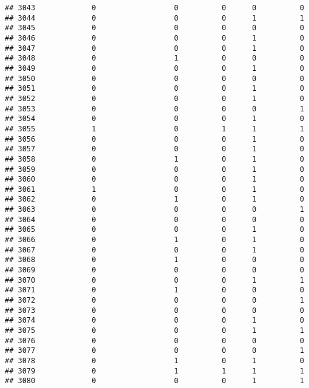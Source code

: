 \documentclass[
]{article}
\begin{document}
\begin{verbatim}
## 3043             0                  0          0      0          0
## 3044             0                  0          0      1          1
## 3045             0                  0          0      0          0
## 3046             0                  0          0      1          0
## 3047             0                  0          0      1          0
## 3048             0                  1          0      0          0
## 3049             0                  0          0      1          0
## 3050             0                  0          0      0          0
## 3051             0                  0          0      1          0
## 3052             0                  0          0      1          0
## 3053             0                  0          0      0          1
## 3054             0                  0          0      1          0
## 3055             1                  0          1      1          1
## 3056             0                  0          0      1          0
## 3057             0                  0          0      1          0
## 3058             0                  1          0      1          0
## 3059             0                  0          0      1          0
## 3060             0                  0          0      1          0
## 3061             1                  0          0      1          0
## 3062             0                  1          0      1          0
## 3063             0                  0          0      0          1
## 3064             0                  0          0      0          0
## 3065             0                  0          0      1          0
## 3066             0                  1          0      1          0
## 3067             0                  0          0      1          0
## 3068             0                  1          0      0          0
## 3069             0                  0          0      0          0
## 3070             0                  0          0      1          1
## 3071             0                  1          0      0          0
## 3072             0                  0          0      0          1
## 3073             0                  0          0      0          0
## 3074             0                  0          0      1          0
## 3075             0                  0          0      1          1
## 3076             0                  0          0      0          0
## 3077             0                  0          0      0          1
## 3078             0                  1          0      1          0
## 3079             0                  1          1      1          1
## 3080             0                  0          0      1          1

\end{verbatim}
\end{document}
